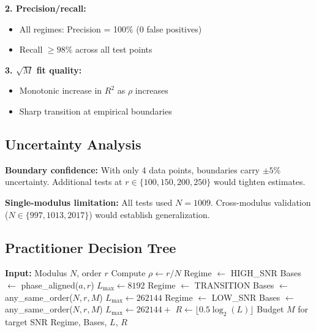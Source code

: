 \textbf{2. Precision/recall:}
\begin{itemize}
    \item All regimes: Precision = 100\% (0 false positives)
    \item Recall $\geq 98\%$ across all test points
\end{itemize}

\textbf{3. $\sqrt{M}$ fit quality:}
\begin{itemize}
    \item Monotonic increase in $R^2$ as $\rho$ increases
    \item Sharp transition at empirical boundaries
\end{itemize}

\subsection{Uncertainty Analysis}

\textbf{Boundary confidence:} With only 4 data points, boundaries carry $\pm 5\%$ uncertainty. Additional tests at $r \in \{100, 150, 200, 250\}$ would tighten estimates.

\textbf{Single-modulus limitation:} All tests used $N=1009$. Cross-modulus validation ($N \in \{997, 1013, 2017\}$) would establish generalization.

\subsection{Practitioner Decision Tree}

\begin{algorithm}[h]
\caption{VRA Regime Selection}
\begin{algorithmic}
\STATE \textbf{Input:} Modulus $N$, order $r$
\STATE Compute $\rho \gets r / N$
    \STATE Regime $\gets$ HIGH\_SNR
    \STATE Bases $\gets$ phase\_aligned($a, r$)
    \STATE $L_{\max} \gets 8192$
    \STATE Regime $\gets$ TRANSITION
    \STATE Bases $\gets$ any\_same\_order($N, r, M$)
    \STATE $L_{\max} \gets 262144$
\ELSE
    \STATE Regime $\gets$ LOW\_SNR
    \STATE Bases $\gets$ any\_same\_order($N, r, M$)
    \STATE $L_{\max} \gets 262144+$
\ENDIF
\STATE $R \gets \lfloor 0.5 \log_2(L) \rfloor$
\STATE Budget $M$ for target SNR
\RETURN Regime, Bases, $L$, $R$
\end{algorithmic}
\end{algorithm}
